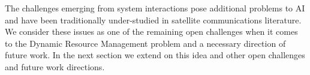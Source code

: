 \documentclass[letterpaper]{article} %
\begin{document}

The challenges emerging from system interactions pose additional problems to AI and have been traditionally under-studied in satellite communications literature. We consider these issues as one of the remaining open challenges when it comes to the Dynamic Resource Management problem and a necessary direction of future work. In the next section we extend on this idea and other open challenges and future work directions.





\end{document}
